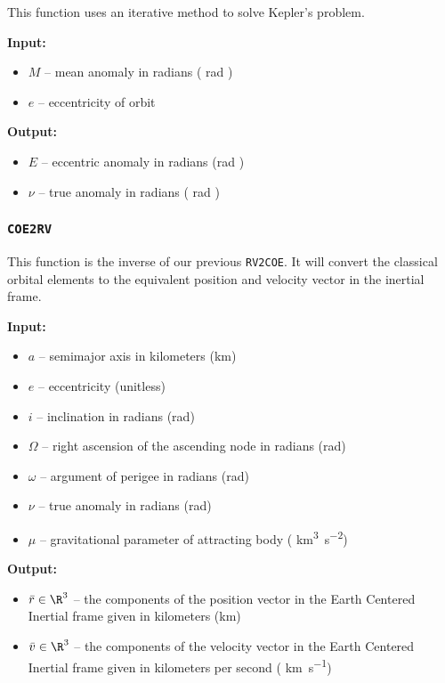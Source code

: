 \documentclass[11pt, reqno]{article}    %
\begin{document}
This function uses an iterative method to solve Kepler's problem.

\noindent\textbf{Input:}
    \begin{itemize}
        \item \( M \) -- mean anomaly in radians ( \si{\radian} )
        \item \( e \) -- eccentricity of orbit 
    \end{itemize}

\noindent \textbf{Output:}
\begin{itemize}
    \item \( E \) -- eccentric anomaly in radians (\si{\radian} )
    \item \( \nu \) -- true anomaly in radians ( \si{\radian} )
\end{itemize}

\subsubsection*{\texttt{COE2RV}}

This function is the inverse of our previous \texttt{RV2COE}.
It will convert the classical orbital elements to the equivalent position and velocity vector in the inertial frame.

\noindent\textbf{Input:}
\begin{itemize}
    \item \( a \)  -- semimajor axis in kilometers (\si{\kilo\meter})
    \item \( e \) -- eccentricity (unitless)
    \item \( i \) -- inclination in radians (\si{\radian})
    \item \( \Omega \) -- right ascension of the ascending node in radians (\si{\radian})
    \item \( \omega \) -- argument of perigee in radians (\si{\radian})
    \item \( \nu \) -- true anomaly in radians (\si{\radian})
    \item \( \mu \) -- gravitational parameter of attracting body ( \si{\kilo\meter\cubed\per\second\squared})
\end{itemize}

\noindent\textbf{Output:}
\begin{itemize}
    \item \( \bar r \in \R^{3} \) -- the components of the position vector in the Earth Centered Inertial frame given in kilometers (\si{\kilo\meter})
    \item \( \bar v \in \R^{3} \) -- the components of the velocity vector in the Earth Centered Inertial frame given in kilometers per second ( \si{\kilo\meter\per\second})
\end{itemize}
\end{document}
